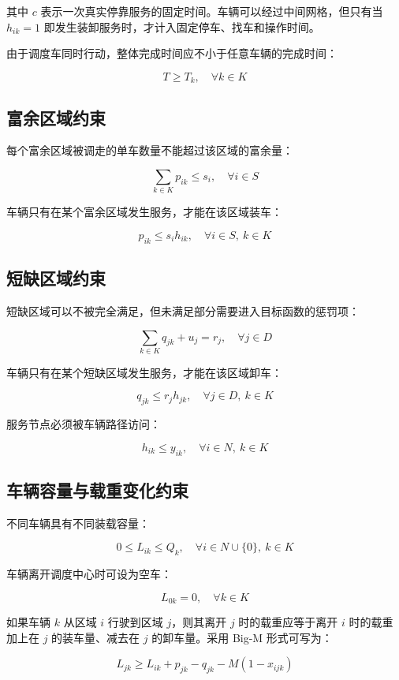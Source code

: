 \documentclass[UTF8,a4paper,12pt]{ctexart}
\begin{document}
其中 \(c\) 表示一次真实停靠服务的固定时间。车辆可以经过中间网格，但只有当 \(h_{ik}=1\) 即发生装卸服务时，才计入固定停车、找车和操作时间。

由于调度车同时行动，整体完成时间应不小于任意车辆的完成时间：

\[
T\ge T_k,\quad \forall k\in K
\]

\subsection{富余区域约束}

每个富余区域被调走的单车数量不能超过该区域的富余量：

\[
\sum_{k\in K}p_{ik}\le s_i,\quad \forall i\in S
\]

车辆只有在某个富余区域发生服务，才能在该区域装车：

\[
p_{ik}\le s_i h_{ik},\quad \forall i\in S,\ k\in K
\]

\subsection{短缺区域约束}

短缺区域可以不被完全满足，但未满足部分需要进入目标函数的惩罚项：

\[
\sum_{k\in K}q_{jk}+u_j=r_j,\quad \forall j\in D
\]

车辆只有在某个短缺区域发生服务，才能在该区域卸车：

\[
q_{jk}\le r_j h_{jk},\quad \forall j\in D,\ k\in K
\]

服务节点必须被车辆路径访问：

\[
h_{ik}\le y_{ik},\quad \forall i\in N,\ k\in K
\]

\subsection{车辆容量与载重变化约束}

不同车辆具有不同装载容量：

\[
0\le L_{ik}\le Q_k,\quad \forall i\in N\cup\{0\},\ k\in K
\]

车辆离开调度中心时可设为空车：

\[
L_{0k}=0,\quad \forall k\in K
\]

如果车辆 \(k\) 从区域 \(i\) 行驶到区域 \(j\)，则其离开 \(j\) 时的载重应等于离开 \(i\) 时的载重加上在 \(j\) 的装车量、减去在 \(j\) 的卸车量。采用 Big-M 形式可写为：

\[
L_{jk}\ge L_{ik}+p_{jk}-q_{jk}-M(1-x_{ijk})
\]
\end{document}
